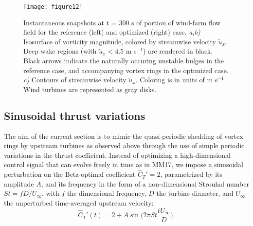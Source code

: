 \documentclass[wes, manuscript]{copernicus}
\begin{document}
\begin{figure}
	\centering
	\texttt{[image: figure12]}
	\caption{Instantaneous snapshots at t = 300 s of portion of wind-farm flow field for the reference (left) and optimized (right) case. \emph{a,b) } Isosurface of vorticity magnitude, colored by streamwise velocity $\widetilde{u}_x$. Deep wake regions (with $\widetilde{u}_x < 4.5$ m s$^{-1}$) are rendered in black. Black arrows indicate the naturally occuring unstable bulges in the reference case, and accompanying vortex rings in the optimized case. \emph{c)} Contours of streamwise velocity $\widetilde{u}_x$. Coloring is in units of m s$^{-1}$. Wind turbines are represented as gray disks. \label{fig:vorticity_windfarm}}
\end{figure}


\subsection{Sinusoidal thrust variations}\label{sec:opt_sinus}
The aim of the current section is to mimic the quasi-periodic shedding of vortex rings by upstream turbines as observed above through the use of simple periodic variations in the thrust coefficient. Instead of optimizing a high-dimensional control signal that can evolve freely in time as in MM17, we impose a sinusoidal perturbation on the Betz-optimal coefficient $\widehat{C}_{T}' = 2$, parametrized by its amplitude $A$, and its frequency in the form of a non-dimensional Strouhal number $St = f D/ U_\infty$, with $f$ the dimensional frequency, $D$ the turbine diameter, and $U_\infty$ the unperturbed time-averaged upstream velocity:
\begin{equation}
\widehat{C}_{T}'(t) = 2 + A \sin \bigg(2\pi St \frac{t U_\infty}{D} \bigg).\label{eq:define_thrust}
\end{equation}
\end{document}
